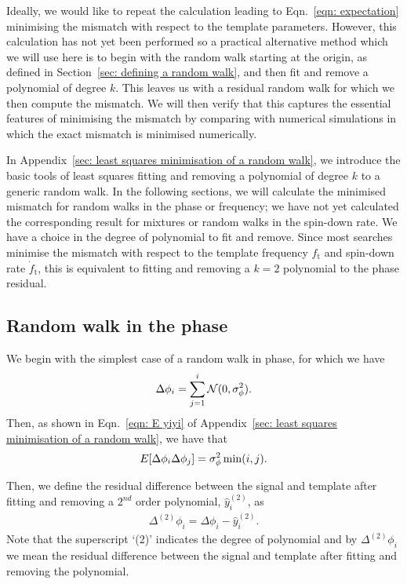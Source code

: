\documentclass[../full_thesis/full_thesis.tex]{subfiles}
\begin{document}
Ideally, we would like to repeat the calculation leading to Eqn.~\eqref{eqn:
expectation} minimising the mismatch with respect to the template parameters.
However, this calculation has not yet been performed so a practical alternative
method which we will use here is to begin with the random walk starting at the
origin, as defined in Section~\ref{sec: defining a random walk}, and then fit and
remove a polynomial of degree $k$. This leaves us with a residual random walk for
which we then compute the mismatch. We will then verify that this captures the
essential features of minimising the mismatch by comparing with numerical
simulations in which the exact mismatch is minimised numerically.

In Appendix~\ref{sec: least squares minimisation of a random walk}, we
introduce the basic tools of least squares fitting and removing a polynomial of
degree $k$ to a generic random walk. In the following sections, we will
calculate the minimised mismatch for random walks in the phase or frequency; we
have not yet calculated the corresponding result for mixtures or random walks
in the spin-down rate. We have a choice in the degree of polynomial to fit and
remove. Since most searches minimise the mismatch with respect to the template
frequency $f_\textrm{t}$ and spin-down rate $\dot{f}_{\textrm{t}}$, this is
equivalent to fitting and removing a $k=2$ polynomial to the phase residual.

\subsection{Random walk in the phase}
\label{sec: minimised rw in phase}
We begin with the simplest case of a random walk in phase, for which we have
\begin{equation}
\Delta\phi_{i} = \sum_{j=1}^{i}\mathcal{N}(0, \sigma_{\phi}^{2}).
\end{equation}
Then, as shown in Eqn.~\eqref{eqn: E yiyi} of Appendix~\ref{sec: least squares
minimisation of a random walk}, we have that
\begin{equation}
E[\Delta\phi_{i} \Delta\phi_{j}] = \sigma_{\phi}^{2} \min(i, j).
\end{equation}

Then, we define the residual difference between the signal and template
after fitting and removing a $2^{nd}$ order polynomial, $\hat{y}_i^{(2)}$, as
\begin{align}
\Delta^{(2)}\phi_i = \Delta\phi_i - \hat{y}_i^{(2)}.
\label{eqn: D2phi}
\end{align}
Note that the superscript `(2)' indicates the degree of polynomial and by
$\Delta^{(2)}\phi_i$ we mean the residual difference between the signal and
template after fitting and removing the polynomial.
\end{document}
